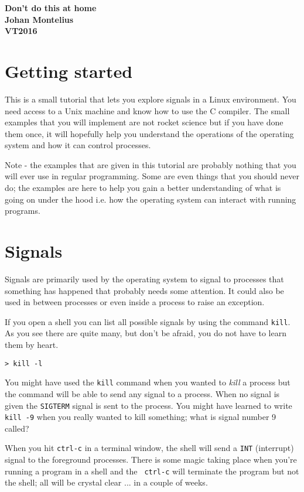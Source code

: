 \documentclass[a4paper,11pt]{article}
\newcommand{\nnsection}[1]{
\section*{#1}
\addcontentsline{toc}{section}{#1}
}
\begin{document}
\begin{center} \vspace{20pt} \textbf{\large Don't do this at home}\\
\vspace{10pt} \textbf{Johan Montelius}\\ \vspace{10pt} \textbf{VT2016}
\end{center}


\nnsection{Getting started}

This is a small tutorial that lets you explore signals in a Linux
environment. You need access to a Unix machine and know how to use the
C compiler. The small examples that you will implement are not rocket
science but if you have done them once, it will hopefully help you
understand the operations of the operating system and how it can control
processes.

Note - the examples that are given in this tutorial are probably
nothing that you will ever use in regular programming. Some are even
things that you should never do; the examples are here to help you
gain a better understanding of what is going on under the hood
i.e. how the operating system can interact with running programs.


\section{Signals}

Signals are primarily used by the operating system to signal to
processes that something has happened that probably needs some
attention. It could also be used in between processes or even inside a
process to raise an exception.

If you open a shell you can list all possible signals by using the
command {\tt kill}. As you see there are quite many, but don't be
afraid, you do not have to learn them by heart.

\begin{verbatim}
> kill -l
\end{verbatim}

You might have used the {\tt  kill} command when you wanted  to {\em
kill} a process but the command will be able to send  any signal to a
process. When no signal is given the  {\tt SIGTERM} signal is sent to the
process. You might have learned to  write {\tt kill -9} when you really
wanted to kill something; what is signal number 9 called?

When you hit {\tt ctrl-c} in a terminal window, the shell will send a
{\tt INT} (interrupt) signal to the foreground processes. There is some
magic taking place when you're running a program in a shell and the {\tt
  ctrl-c} will terminate the program but not the shell; all will be
crystal clear ... in a couple of weeks.
\end{document}

